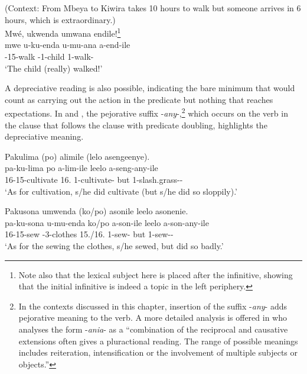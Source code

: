 \documentclass[output=paper]{langscibook}
\begin{document}
\z
\pagebreak
\ea
\label{walking}
(Context: From Mbeya to Kiwira takes 10 hours to walk but someone arrives in 6 hours, which is extraordinary.)\\
Mwé, ukwenda umwana endile!\footnote{Note also that the lexical subject here is placed after the infinitive, showing that the initial infinitive is indeed a topic in the left periphery.} \\
\gll
mwe   u-ku-enda  u-mu-ana  a-end-ile\\
\EXCLAM{}  \AUG{}-15-walk  \AUG{}-1-child  1\SM{}-walk-\PFV{}\\
\glt
‘The child (really) walked!’\\

\z


A depreciative reading is also possible, indicating the bare minimum that would count as carrying out the action in the predicate but nothing that reaches expectations. In  and , the pejorative suffix \nobreakdash-\textit{any}-,\footnote{In the contexts discussed in this chapter, insertion of the suffix \nobreakdash-\textit{any}- adds pejorative meaning to the verb. A more detailed analysis is offered in \citet[108]{Persohn2020} who analyses the form \nobreakdash-\textit{ania}- as a “combination of the reciprocal and causative extensions often gives a pluractional reading. The range of possible meanings includes reiteration, intensification or the involvement of multiple subjects or objects.”} which occurs on the verb in the clause that follows the clause with predicate doubling, highlights the depreciative meaning.

\ea
\label{bkm:Ref122522449}
Pakulima (po) alimile (lelo asengeenye).\\
\gll
pa-ku-lima  po  a-lim-ile  leelo  a-seng-any-ile\\
16-15-cultivate  16.\PRO{}  1\SM{}-cultivate-\PFV{}  but  1\SM{}-slash.grass-\PEJ{}-\PFV{}\\
\glt
‘As for cultivation, s/he did cultivate (but s/he did so sloppily).’\\

\z


\ea
\label{bkm:Ref122522450}
Pakusona umwenda (ko/po) asonile leelo asonenie.\\
\gll
pa-ku-sona  u-mu-enda  ko/po  a-son-ile  leelo  a-son-any-ile\\
16-15-sew  \AUG{}-3-clothes  15.\PRO{}/16.\PRO{}  1\SM{}-sew-\PFV{}  but  1\SM{}-sew-\PEJ{}-\PFV{}\\
\glt
‘As for the sewing the clothes, s/he sewed, but did so badly.’\\
\end{document}
